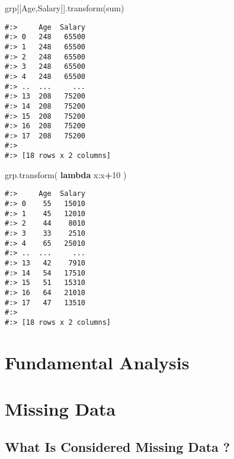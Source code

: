 \documentclass[
]{book}
\newenvironment{Shaded}{\begin{snugshade}}{\end{snugshade}}
\newcommand{\DecValTok}[1]{\textcolor[rgb]{0.06,0.06,0.06}{#1}}
\newcommand{\KeywordTok}[1]{\textcolor[rgb]{0.27,0.27,0.27}{\textbf{#1}}}
\newcommand{\NormalTok}[1]{#1}
\newcommand{\OperatorTok}[1]{\textcolor[rgb]{0.43,0.43,0.43}{\textbf{#1}}}
\newcommand{\StringTok}[1]{\textcolor[rgb]{0.5,0.5,0.5}{#1}}
\begin{document}
\begin{Shaded}
\begin{Highlighting}[]
\NormalTok{grp[[}\StringTok{\textquotesingle{}Age\textquotesingle{}}\NormalTok{,}\StringTok{\textquotesingle{}Salary\textquotesingle{}}\NormalTok{]].transform(}\StringTok{\textquotesingle{}sum\textquotesingle{}}\NormalTok{)}
\end{Highlighting}
\end{Shaded}

\begin{verbatim}
#:>     Age  Salary
#:> 0   248   65500
#:> 1   248   65500
#:> 2   248   65500
#:> 3   248   65500
#:> 4   248   65500
#:> ..  ...     ...
#:> 13  208   75200
#:> 14  208   75200
#:> 15  208   75200
#:> 16  208   75200
#:> 17  208   75200
#:> 
#:> [18 rows x 2 columns]
\end{verbatim}

\begin{Shaded}
\begin{Highlighting}[]
\NormalTok{grp.transform( }\KeywordTok{lambda}\NormalTok{ x:x}\OperatorTok{+}\DecValTok{10}\NormalTok{ )}
\end{Highlighting}
\end{Shaded}

\begin{verbatim}
#:>     Age  Salary
#:> 0    55   15010
#:> 1    45   12010
#:> 2    44    8010
#:> 3    33    2510
#:> 4    65   25010
#:> ..  ...     ...
#:> 13   42    7910
#:> 14   54   17510
#:> 15   51   15310
#:> 16   64   21010
#:> 17   47   13510
#:> 
#:> [18 rows x 2 columns]
\end{verbatim}

\hypertarget{fundamental-analysis}{%
\section{Fundamental Analysis}\label{fundamental-analysis}}

\hypertarget{missing-data}{%
\section{Missing Data}\label{missing-data}}

\hypertarget{what-is-considered-missing-data}{%
\subsection{What Is Considered Missing Data ?}\label{what-is-considered-missing-data}}
\end{document}
